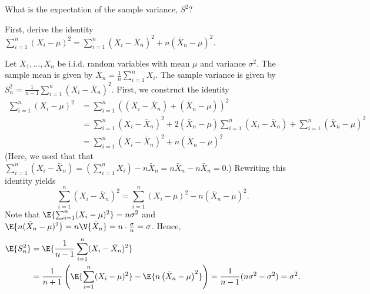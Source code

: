	\begin{exercise}\label{ex:chap06:04}
		What is the expectation of the sample variance, $S^2$?
		\begin{hint}
			First, derive the identity $\sum_{i = 1}^n (X_i - \mu)^2 = \sum_{i = 1}^n (X_i - \bar{X}_n)^2 + n (\bar{X}_n - \mu)^2$.
		\end{hint}
		\begin{solution}
			Let $X_1, \ldots, X_n$ be i.i.d. random variables with mean $\mu$ and variance $\sigma^2$. The sample mean is given by $\bar{X}_n = \frac{1}{n} \sum_{i = 1}^n X_i$. The sample variance is given by $S_n^2 = \frac{1}{n - 1} \sum_{i = 1}^n (X_i - \bar{X}_n)^2$. First, we construct the identity
			\begin{align*}
				\sum_{i = 1}^n (X_i - \mu)^2 & = \sum_{i = 1}^n ((X_i - \bar{X}_n) + (\bar{X}_n - \mu))^2 \\
				& = \sum_{i = 1}^n (X_i - \bar{X}_n)^2 + 2 (\bar{X}_n - \mu) \sum_{i = 1}^n (X_i - \bar{X}_n) + \sum_{i = 1}^n (\bar{X}_n - \mu)^2 \\
				& = \sum_{i = 1}^n (X_i - \bar{X}_n)^2 + n (\bar{X}_n - \mu)^2
			\end{align*}
			(Here, we used that that $\sum_{i = 1}^n (X_i - \bar{X}_n) = \left(\sum_{i = 1}^n X_i\right) - n \bar{X}_n = n \bar{X}_n - n \bar{X}_n = 0$.) Rewriting this identity yields
			\begin{equation*}
				\sum_{i = 1}^n (X_i - \bar{X}_n)^2 = \sum_{i = 1}^n (X_i - \mu)^2 - n (\bar{X}_n - \mu)^2.
			\end{equation*}
			Note that $\E{\sum_{i = 1}^n (X_i - \mu)^2} = n \sigma^2$ and $\E{n (\bar{X}_n - \mu)^2} = n \V{\bar{X}_n} = n \cdot \frac{\sigma}{n} = \sigma$. Hence,
			\begin{align*}
				\E{S_n^2} & = \E{\frac{1}{n - 1} \sum_{i = 1}^n (X_i - \bar{X}_n)^2} \\
				& = \frac{1}{n + 1} \left(\E{\sum_{i = 1}^n (X_i - \mu)^2} - \E{n\left(\bar{X}_n - \mu\right)^2}\right) = \frac{1}{n - 1} (n \sigma^2 - \sigma^2) = \sigma^2.
			\end{align*}
		\end{solution}
	\end{exercise}
	
